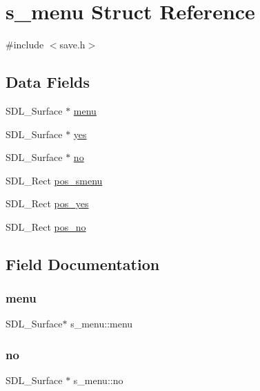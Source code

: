 \hypertarget{structs__menu}{}\section{s\+\_\+menu Struct Reference}
\label{structs__menu}


{\ttfamily \#include $<$save.\+h$>$}

\subsection*{Data Fields}
\begin{DoxyCompactItemize}
\item 
S\+D\+L\+\_\+\+Surface $\ast$ \hyperlink{structs__menu_a63a54d0a1800992c818a7035e4b6cdfb}{menu}
\item 
S\+D\+L\+\_\+\+Surface $\ast$ \hyperlink{structs__menu_ae2cc359de85d9186f41239090425aa2e}{yes}
\item 
S\+D\+L\+\_\+\+Surface $\ast$ \hyperlink{structs__menu_a6a98a2b24b32b41da278e6db0a2e0bf0}{no}
\item 
S\+D\+L\+\_\+\+Rect \hyperlink{structs__menu_a94c480395e7615eea72ac573b49e2f05}{pos\+\_\+smenu}
\item 
S\+D\+L\+\_\+\+Rect \hyperlink{structs__menu_a885acf2f224092c5bf18906d461c7086}{pos\+\_\+yes}
\item 
S\+D\+L\+\_\+\+Rect \hyperlink{structs__menu_a843a16fd3756989eb7ceaaa3367ef995}{pos\+\_\+no}
\end{DoxyCompactItemize}


\subsection{Field Documentation}
\mbox{\label{structs__menu_a63a54d0a1800992c818a7035e4b6cdfb}} 
\subsubsection{\texorpdfstring{menu}{menu}}
{\footnotesize\ttfamily S\+D\+L\+\_\+\+Surface$\ast$ s\+\_\+menu\+::menu}

\mbox{\label{structs__menu_a6a98a2b24b32b41da278e6db0a2e0bf0}} 
\subsubsection{\texorpdfstring{no}{no}}
{\footnotesize\ttfamily S\+D\+L\+\_\+\+Surface $\ast$ s\+\_\+menu\+::no}

